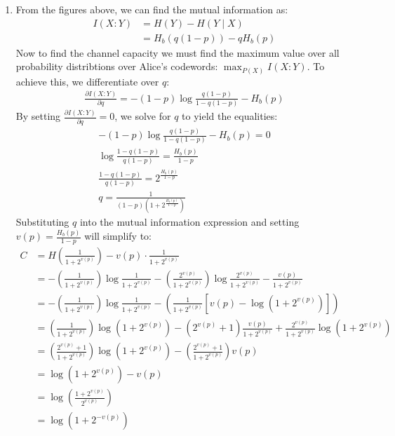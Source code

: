\documentclass[12pt]{article}%
\begin{document}
\begin{enumerate}
  \item
  From the figures above, we can find the mutual information as:
  \begin{align*}
    I(X:Y) & = H(Y) - H(Y\mid X) \\
           & = H_b(q(1-p)) - qH_b(p)
  \end{align*}
  Now to find the channel capacity we must find the maximum value over all probability distribtions over Alice's codewords: $\max_{P(X)}I(X:Y)$. To achieve this, we differentiate over $q$:
  \begin{align*}
    \frac{\partial I(X:Y)}{\partial q} = -(1-p)\log{\frac{q(1-p)}{1 - q(1-p)}} - H_b(p)
  \end{align*}
  By setting $\frac{\partial I(X:Y)}{\partial q} = 0$, we solve for $q$ to yield the equalities:
  \begin{gather*}
    -(1-p)\log{\frac{q(1-p)}{1 - q(1-p)}} - H_b(p) = 0 \\
    \log{\frac{1- q(1-p)}{q(1-p)}} = \frac{H_b(p)}{1-p} \\
    \frac{1- q(1-p)}{q(1-p)} = 2^{\frac{H_b(p)}{1-p}} \\
    q = \frac{1}{(1-p)\left(1 + 2^{\frac{H_b(p)}{1-p}}\right)}
  \end{gather*}
  Substituting $q$ into the mutual information expression and setting $v(p) = \frac{H_b(p)}{1-p}$ will simplify to:
  \begin{align*}
  C & = H\left(\frac{1}{1 + 2^{v(p)}} \right) - v(p)\cdot \frac{1}{1 + 2^{v(p)}} \\
    & = -\left(\frac{1}{1 + 2^{v(p)}} \right)\log{\frac{1}{1 + 2^{v(p)}}} -\left(\frac{2^{v(p)}}{1 + 2^{v(p)}} \right)\log{\frac{2^{v(p)}}{1 + 2^{v(p)}}} - \frac{v(p)}{1 + 2^{v(p)}} \\
    & = -\left(\frac{1}{1 + 2^{v(p)}} \right)\log{\frac{1}{1 + 2^{v(p)}}} - \left(\frac{1}{1 + 2^{v(p)}}\left[v(p) - \log{(1 + 2^{v(p)})} \right] \right) \\
    & = \left(\frac{1}{1 + 2^{v(p)}} \right)\log{(1 + 2^{v(p)})} - \left(2^{v(p)}+1 \right)\frac{v(p)}{1 + 2^{v(p)}} + \frac{2^{v(p)} }{1 + 2^{v(p)}} \log{(1 + 2^{v(p)})} \\
    & = \left(\frac{2^{v(p)}+ 1}{1 + 2^{v(p)}} \right) \log{(1 + 2^{v(p)})} - \left(\frac{2^{v(p)}+1 }{1 + 2^{v(p)}}\right)v(p) \\
    & =  \log{(1 + 2^{v(p)})} - v(p) \\
    & = \log{\left( \frac{1 + 2^{v(p)}}{2^{v(p)}} \right)} \\
    & = \log{\left(1 + 2^{-v(p)}\right)} \\

\end{align*}
\end{enumerate}
\end{document}
